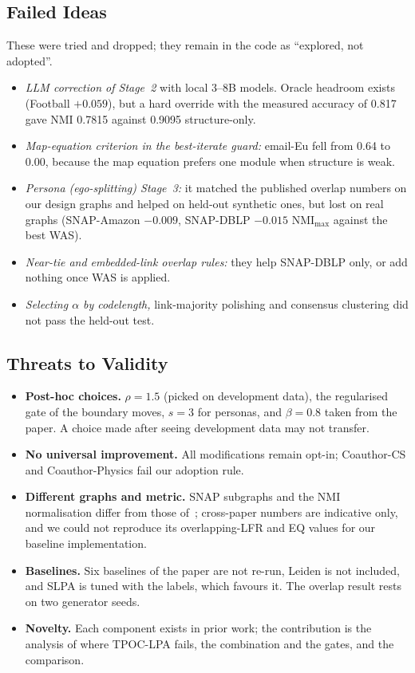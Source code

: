 \documentclass[conference]{IEEEtran}
\begin{document}
\subsection{Failed Ideas}\label{sec:neg}
These were tried and dropped; they remain in the code as ``explored, not adopted''.
\begin{itemize}
\item \emph{LLM correction of Stage~2} with local 3--8B models. Oracle headroom exists (Football $+0.059$), but a hard override with the measured accuracy of 0.817 gave NMI 0.7815 against 0.9095 structure-only.
\item \emph{Map-equation criterion in the best-iterate guard:} email-Eu fell from 0.64 to 0.00, because the map equation prefers one module when structure is weak.
\item \emph{Persona (ego-splitting) Stage~3:} it matched the published overlap numbers on our design graphs and helped on held-out synthetic ones, but lost on real graphs (SNAP-Amazon $-0.009$, SNAP-DBLP $-0.015$ $\mathrm{NMI}_{\max}$ against the best WAS).
\item \emph{Near-tie and embedded-link overlap rules:} they help SNAP-DBLP only, or add nothing once WAS is applied.
\item \emph{Selecting $\alpha$ by codelength,} link-majority polishing and consensus clustering did not pass the held-out test.
\end{itemize}

\subsection{Threats to Validity}\label{sec:limits}
\begin{itemize}
\item \textbf{Post-hoc choices.} $\rho=1.5$ (picked on development data), the regularised gate of the boundary moves, $s=3$ for personas, and $\beta=0.8$ taken from the paper. A choice made after seeing development data may not transfer.
\item \textbf{No universal improvement.} All modifications remain opt-in; Coauthor-CS and Coauthor-Physics fail our adoption rule.
\item \textbf{Different graphs and metric.} SNAP subgraphs and the NMI normalisation differ from those of~\cite{kong2026}; cross-paper numbers are indicative only, and we could not reproduce its overlapping-LFR and EQ values for our baseline implementation.
\item \textbf{Baselines.} Six baselines of the paper are not re-run, Leiden is not included, and SLPA is tuned with the labels, which favours it. The overlap result rests on two generator seeds.
\item \textbf{Novelty.} Each component exists in prior work; the contribution is the analysis of where TPOC-LPA fails, the combination and the gates, and the comparison.
\end{itemize}
\end{document}
